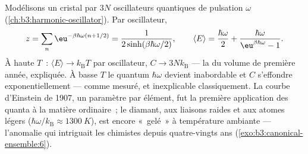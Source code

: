 \begin{example}\label{ex:b3:canonical-ensemble:einstein}
Modélisons un cristal par $3N$ oscillateurs quantiques de pulsation
$\omega$ (\cref{ch:b3:harmonic-oscillator}). Par oscillateur,
\[
z = \sum_n\eu^{-\beta\hbar\omega(n + 1/2)}
 = \frac{1}{2\sinh(\beta\hbar\omega/2)} , \qquad
\langle E\rangle = \frac{\hbar\omega}{2} +
\frac{\hbar\omega}{\eu^{\beta\hbar\omega} - 1} .
\]
À haute $T$~: $\langle E\rangle \to k_{\text{B}}T$ par oscillateur,
$C \to 3Nk_{\text{B}}$ --- la  du volume de
première année, expliquée. À basse $T$ le quantum $\hbar\omega$
devient inabordable et $C$ s'effondre exponentiellement --- comme
mesuré, et inexplicable classiquement. La courbe d'Einstein de 1907,
un paramètre par élément, fut la première application des quanta à la
matière ordinaire~; le diamant, aux liaisons raides et aux atomes
légers ($\hbar\omega/k_{\text{B}}
\approx \qty{1300}{K}$), est encore «~gelé~» à température ambiante
--- l'anomalie qui intriguait les chimistes depuis quatre-vingts ans
(\cref{exo:b3:canonical-ensemble:6}).
\end{example}

